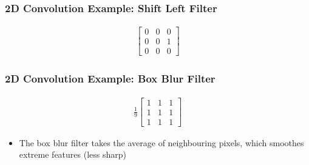 \documentclass[letterpaper,12pt]{article}
\begin{document}
\subsubsection{2D Convolution Example: Shift Left Filter}
\begin{align}
 \begin{bmatrix}
  0 & 0 & 0 \\
  0 & 0 & 1 \\
  0 & 0 & 0
 \end{bmatrix}
 \tag{Shifts image left by 1 pixel}
\end{align}

\subsubsection{2D Convolution Example: Box Blur Filter}
\begin{align}
 \frac{1}{9}\begin{bmatrix}
  1 & 1 & 1 \\
  1 & 1 & 1 \\
  1 & 1 & 1
 \end{bmatrix}
 \tag{Blurs image}
\end{align}
\begin{itemize}
 \item The box blur filter takes the average of neighbouring pixels, which smoothes extreme features (less sharp)
\end{itemize}
\end{document}
